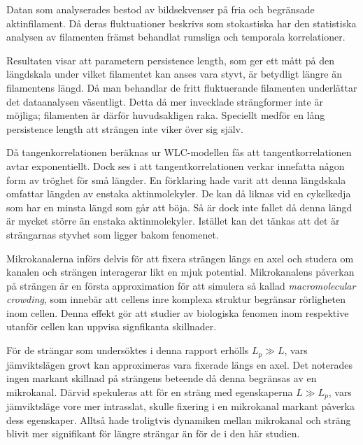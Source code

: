 Datan som analyserades bestod av bildsekvenser på fria och begränsade aktinfilament. Då deras fluktuationer beskrivs som stokastiska har den statistiska analysen av filamenten främst behandlat rumsliga och temporala korrelationer. 

Resultaten visar att parametern persistence length, som ger ett mått på den längdskala under vilket filamentet kan anses vara styvt, är betydligt längre än filamentens längd. Då man behandlar de fritt fluktuerande filamenten underlättar det dataanalysen väsentligt. Detta då mer invecklade strängformer inte är möjliga; filamenten är därför huvudsakligen raka. Speciellt medför en lång persistence length att strängen inte viker över sig själv. 


Då tangenkorrelationen beräknas ur WLC-modellen fås att tangentkorrelationen avtar exponentiellt. Dock ses i  att tangentkorrelationen verkar innefatta någon form av tröghet för små längder. En förklaring hade varit att denna längdskala omfattar längden av enstaka aktinmolekyler. De kan då liknas vid en cykelkedja som har en minsta längd som går att böja. Så är dock inte fallet då denna längd är mycket större än enstaka aktinmolekyler. Istället kan det tänkas att det är strängarnas styvhet som ligger bakom fenomenet.  

Mikrokanalerna införs delvis för att fixera strängen längs en axel och studera om kanalen och strängen interagerar likt en mjuk potential. Mikrokanalens påverkan på strängen är en första approximation för att simulera så kallad \emph{macromolecular crowding}, som innebär att cellens inre komplexa struktur begränsar rörligheten inom cellen. Denna effekt gör att studier av biologiska fenomen inom respektive utanför cellen kan uppvisa signfikanta skillnader. 

För de strängar som undersöktes i denna rapport erhölls $L_{p}\gg L$, vars jämviktslägen grovt kan approximeras vara fixerade längs en axel. Det noterades ingen markant skillnad på strängens beteende då denna begränsas av en mikrokanal.
Därvid spekuleras att för en sträng med egenskaperna $L\gg L_{p}$, vars jämviktsläge vore mer intrasslat, skulle fixering i en mikrokanal markant påverka dess egenskaper. Alltså hade troligtvis dynamiken mellan mikrokanal och sträng blivit mer signifikant för längre strängar än för de i den här studien.

